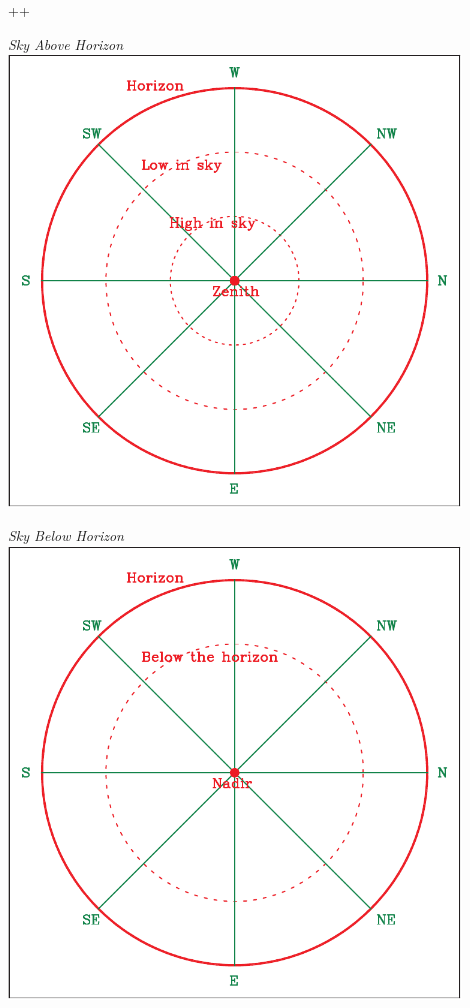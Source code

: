 ++\documentclass[12pt]{article}
\begin{document}
\begin{enumerate}
		\begin{center}
		\begin{minipage}{0.45\textwidth}
			\begin{center}
\it Sky Above Horizon\\
				\includegraphics[width=0.9\textwidth]{topsky-crop.pdf}
			\end{center}
		\end{minipage}
		\begin{minipage}{0.45\textwidth}
			\begin{center}
				\it Sky Below Horizon\\
				\includegraphics[width=0.9\textwidth]{botsky-crop.pdf}
			\end{center}
		\end{minipage}
		\end{center}
		

\end{enumerate}
\end{document}
